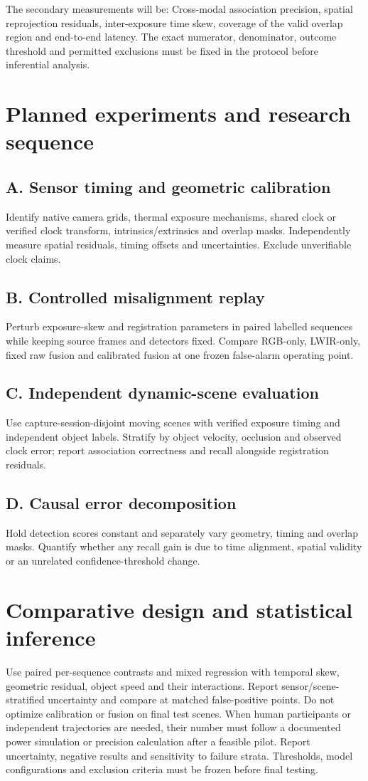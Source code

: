 \documentclass[11pt,a4paper]{article}
\begin{document}
The secondary measurements will be: Cross-modal association precision, spatial reprojection residuals, inter-exposure time skew, coverage of the valid overlap region and end-to-end latency. The exact numerator, denominator, outcome threshold and permitted exclusions must be fixed in the protocol before inferential analysis.

\section{Planned experiments and research sequence}
\subsection{A. Sensor timing and geometric calibration}
Identify native camera grids, thermal exposure mechanisms, shared clock or verified clock transform, intrinsics/extrinsics and overlap masks. Independently measure spatial residuals, timing offsets and uncertainties. Exclude unverifiable clock claims.

\subsection{B. Controlled misalignment replay}
Perturb exposure-skew and registration parameters in paired labelled sequences while keeping source frames and detectors fixed. Compare RGB-only, LWIR-only, fixed raw fusion and calibrated fusion at one frozen false-alarm operating point.

\subsection{C. Independent dynamic-scene evaluation}
Use capture-session-disjoint moving scenes with verified exposure timing and independent object labels. Stratify by object velocity, occlusion and observed clock error; report association correctness and recall alongside registration residuals.

\subsection{D. Causal error decomposition}
Hold detection scores constant and separately vary geometry, timing and overlap masks. Quantify whether any recall gain is due to time alignment, spatial validity or an unrelated confidence-threshold change.

\section{Comparative design and statistical inference}
Use paired per-sequence contrasts and mixed regression with temporal skew, geometric residual, object speed and their interactions. Report sensor/scene-stratified uncertainty and compare at matched false-positive points. Do not optimize calibration or fusion on final test scenes. When human participants or independent trajectories are needed, their number must follow a documented power simulation or precision calculation after a feasible pilot. Report uncertainty, negative results and sensitivity to failure strata. Thresholds, model configurations and exclusion criteria must be frozen before final testing.
\end{document}
